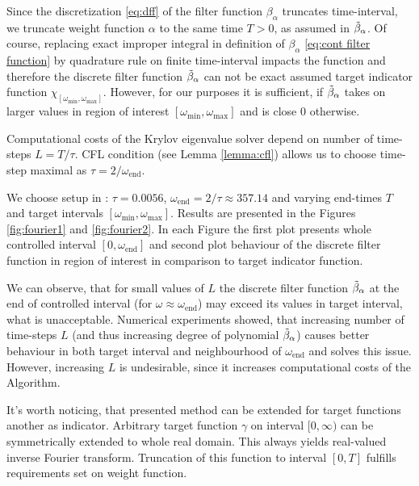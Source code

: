 \documentclass[a4paper,11pt,bibliography=totoc,listof=totoc,headinclude=true,cleardoublepage=empty,oneside]{scrbook}
\newcommand{\dff}{\Tilde{\beta}_\alpha}
\newcommand{\e}{\mathrm{end}}
\begin{document}
Since the discretization \eqref{eq:dff} of the filter function $\beta_\alpha$ truncates time-interval, we truncate weight function $\alpha$ to the same time $T>0$, as assumed in $\dff$. Of course, replacing exact improper integral in definition of $\beta_\alpha$ \eqref{eq:cont filter function} by quadrature rule on finite time-interval impacts the function and therefore the discrete filter function $\dff$ can not be exact assumed target indicator function $\chi_{\left[\omega_{\min}, \omega_{\max}\right]}$. However, for our purposes it is sufficient, if $\dff$ takes on larger values in region of interest $\left[\omega_{\min}, \omega_{\max}\right]$ and is close 0 otherwise. 

Computational costs of the Krylov eigenvalue solver depend on number of time-steps $L=T/\tau$. CFL condition (see Lemma \ref{lemma:cfl}) allows us to choose time-step maximal as $\tau = 2/\omega_{\e}$. 

We choose setup in \cite[section 3.1.2]{nannen}: $\tau = 0.0056$, $\omega_\e = 2/\tau \approx 357.14$ and varying end-times $T$ and target intervals $\left[\omega_{\min}, \omega_{\max}\right]$. Results are presented in the Figures \ref{fig:fourier1} and \ref{fig:fourier2}. In each Figure the first plot presents whole controlled interval $\left[0, \omega_\e\right]$ and second plot behaviour of the discrete filter function in region of interest in comparison to target indicator function.

We can observe, that for small values of $L$ the discrete filter function $\dff$ at the end of controlled interval (for $\omega \approx \omega_\e$) may exceed its values in target interval, what is unacceptable. Numerical experiments showed, that increasing number of time-steps $L$ (and thus increasing degree of polynomial $\dff$) causes better behaviour in both target interval and neighbourhood of $\omega_\e$ and solves this issue. However, increasing $L$ is undesirable, since it increases computational costs of the Algorithm.

It's worth noticing, that presented method can be extended for target functions another as indicator. Arbitrary target function $\gamma$ on interval $[0, \infty)$ can be symmetrically extended to whole real domain. This always yields real-valued inverse Fourier transform. Truncation of this function to interval $[0, T]$ fulfills requirements set on weight function. 
\end{document}
